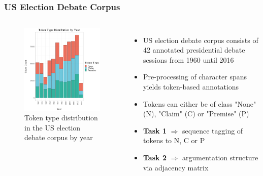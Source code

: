 \documentclass{beamer}
\begin{document}
\subsection{}
\begin{framefont}{\footnotesize}
	\begin{frame}
		\frametitle{US Election Debate Corpus}
			\begin{columns}
				\begin{figure}
				    \centering
					\includegraphics[trim={0.05cm 0.05cm 0.05cm 0.05cm},clip,width=5.3cm]{global.pdf}
					\caption{Token type distribution in the US election debate corpus by year}
				\end{figure}
				\begin{itemize}
					\setlength\itemsep{1.5em}
					\item US election debate corpus consists of 42 annotated presidential debate sessions from 1960 until 2016 \citep{haddadan-etal-2019-yes}
					\item Pre-processing of character spans yields token-based annotations
					\item Tokens can either be of class "None" (N), "Claim" (C) or "Premise" (P)
					\item \textbf{Task 1} $\Longrightarrow$ sequence tagging of tokens to N, C or P
					\item \textbf{Task 2} $\Longrightarrow$ argumentation structure via adjacency matrix
				\end{itemize}
			\end{columns}
	\end{frame}
\end{framefont}
\end{document}
